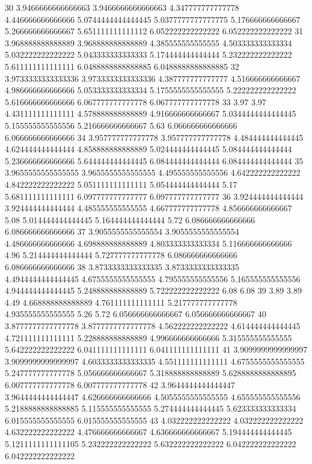 30 3.9466666666666663 3.9466666666666663 4.347777777777778 4.446666666666666 5.0744444444444445 5.0377777777777775 5.176666666666667 5.266666666666667 5.651111111111112 6.052222222222222 6.052222222222222
31 3.968888888888889 3.968888888888889 4.385555555555555 4.503333333333334 5.032222222222222 5.043333333333333 5.174444444444444 5.232222222222222 5.611111111111111 6.0488888888888885 6.0488888888888885
32 3.9733333333333336 3.9733333333333336 4.387777777777777 4.516666666666667 4.986666666666666 5.053333333333334 5.1755555555555555 5.222222222222222 5.616666666666666 6.067777777777778 6.067777777777778
33 3.97 3.97 4.431111111111111 4.578888888888889 4.916666666666667 5.0344444444444445 5.155555555555556 5.216666666666667 5.63 6.066666666666666 6.066666666666666
34 3.957777777777778 3.957777777777778 4.484444444444445 4.624444444444444 4.858888888888889 5.024444444444445 5.084444444444444 5.236666666666666 5.644444444444445 6.084444444444444 6.084444444444444
35 3.9655555555555555 3.9655555555555555 4.495555555555556 4.642222222222222 4.842222222222222 5.051111111111111 5.054444444444444 5.17 5.681111111111111 6.097777777777777 6.097777777777777
36 3.924444444444444 3.924444444444444 4.485555555555555 4.667777777777778 4.856666666666667 5.08 5.014444444444445 5.164444444444444 5.72 6.086666666666666 6.086666666666666
37 3.9055555555555554 3.9055555555555554 4.486666666666666 4.698888888888889 4.803333333333334 5.116666666666666 4.96 5.214444444444444 5.727777777777778 6.086666666666666 6.086666666666666
38 3.8733333333333335 3.8733333333333335 4.4944444444444445 4.6755555555555555 4.795555555555556 5.165555555555556 4.944444444444445 5.248888888888889 5.722222222222222 6.08 6.08
39 3.89 3.89 4.49 4.668888888888889 4.761111111111111 5.217777777777778 4.935555555555555 5.26 5.72 6.056666666666667 6.056666666666667
40 3.8777777777777778 3.8777777777777778 4.562222222222222 4.614444444444445 4.721111111111111 5.228888888888889 4.996666666666666 5.315555555555555 5.642222222222222 6.041111111111111 6.041111111111111
41 3.9099999999999997 3.9099999999999997 4.6033333333333335 4.551111111111111 4.6755555555555555 5.247777777777778 5.056666666666667 5.318888888888889 5.6288888888888895 6.007777777777778 6.007777777777778
42 3.9644444444444447 3.9644444444444447 4.626666666666666 4.5055555555555555 4.655555555555556 5.2188888888888885 5.115555555555555 5.274444444444445 5.623333333333334 6.015555555555555 6.015555555555555
43 4.032222222222222 4.032222222222222 4.632222222222222 4.476666666666667 4.636666666666667 5.194444444444445 5.1211111111111105 5.232222222222222 5.632222222222222 6.042222222222222 6.042222222222222
